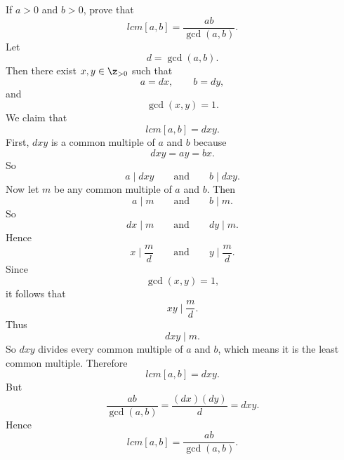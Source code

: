 \begin{problem}{
    If $a>0$ and $b>0$, prove that
    \[
        lcm[a,b]=\frac{ab}{\gcd(a,b)}.
    \]
}
    Let
    \[
        d=\gcd(a,b).
    \]
    Then there exist $x,y\in\z_{>0}$ such that
    \[
        a=dx,
        \qquad
        b=dy,
    \]
    and
    \[
        \gcd(x,y)=1.
    \]
    We claim that
    \[
        lcm[a,b]=dxy.
    \]
    First, $dxy$ is a common multiple of $a$ and $b$ because
    \[
        dxy=ay=bx.
    \]
    So
    \[
        a\mid dxy
        \qquad\text{and}\qquad
        b\mid dxy.
    \]
    Now let $m$ be any common multiple of $a$ and $b$.
    Then
    \[
        a\mid m
        \qquad\text{and}\qquad
        b\mid m.
    \]
    So
    \[
        dx\mid m
        \qquad\text{and}\qquad
        dy\mid m.
    \]
    Hence
    \[
        x\mid \frac{m}{d}
        \qquad\text{and}\qquad
        y\mid \frac{m}{d}.
    \]
    Since
    \[
        \gcd(x,y)=1,
    \]
    it follows that
    \[
        xy\mid \frac{m}{d}.
    \]
    Thus
    \[
        dxy\mid m.
    \]
    So $dxy$ divides every common multiple of $a$ and $b$, which means it is the least common multiple.
    Therefore
    \[
        lcm[a,b]=dxy.
    \]
    But
    \[
        \frac{ab}{\gcd(a,b)}
        =
        \frac{(dx)(dy)}{d}
        =
        dxy.
    \]
    Hence
    \[
        lcm[a,b]=\frac{ab}{\gcd(a,b)}.
    \]
\end{problem}

